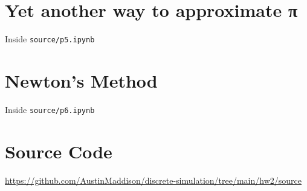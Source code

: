 \documentclass{article}
\begin{document}
\section{Yet another way to approximate π}
Inside \texttt{source/p5.ipynb}

\section{Newton’s Method}
Inside \texttt{source/p6.ipynb}

\section*{Source Code}
\href{https://github.com/AustinMaddison/discrete-simulation/tree/main/hw2/source}{https://github.com/AustinMaddison/discrete-simulation/tree/main/hw2/source}

%
%
\end{document}
